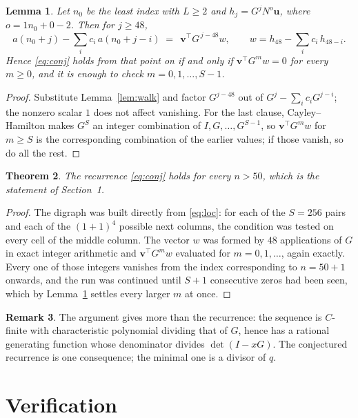 \documentclass[11pt,a4paper]{article}
\theoremstyle{plain}
\newtheorem{theorem}{Theorem}
\newtheorem{lemma}[theorem]{Lemma}
\theoremstyle{definition}
\newtheorem{remark}[theorem]{Remark}
\begin{document}
\begin{lemma}\label{lem:crit}
Let $n_0$ be the least index with $L\ge2$ and $h_j=G^{j}N^{o}\mathbf{u}$, where
$o=1n_0+0-2$. Then for $j\ge48$,
\[
a(n_0+j)-\sum_i c_i\,a(n_0+j-i)\;=\;\,\mathbf{v}^{\!\top}G^{\,j-48}w,
\qquad w=h_{48}-\sum_i c_i\,h_{48-i} .
\]
Hence \eqref{eq:conj} holds from that point on if and only if
$\mathbf{v}^{\!\top}G^{m}w=0$ for every $m\ge0$, and it is enough to check
$m=0,1,\dots,S-1$.
\end{lemma}

\begin{proof}
Substitute Lemma~\ref{lem:walk} and factor $G^{j-48}$ out of
$G^{j}-\sum_ic_iG^{j-i}$; the nonzero scalar $1$ does not affect
vanishing. For the last clause, Cayley--Hamilton makes $G^{S}$ an integer combination of
$I,G,\dots,G^{S-1}$, so $\mathbf{v}^{\!\top}G^{m}w$ for $m\ge S$ is the corresponding
combination of the earlier values; if those vanish, so do all the rest.
\end{proof}

\begin{theorem}
The recurrence \eqref{eq:conj} holds for every $n>50$, which is the statement of
Section~1.
\end{theorem}

\begin{proof}
The digraph was built directly from \eqref{eq:loc}: for each of the $S=256$ pairs and each
of the $(1+1)^{4}$ possible next columns, the condition was tested on every cell of
the middle column. The vector $w$ was formed by $48$ applications of $G$ in exact integer
arithmetic and $\mathbf{v}^{\!\top}G^{m}w$ evaluated for $m=0,1,\dots$, again exactly.
Every one of those integers vanishes from the index corresponding to $n=50+1$ onwards,
and the run was continued until $S+1$ consecutive zeros had been seen, which by
Lemma~\ref{lem:crit} settles every larger $m$ at once.
\end{proof}

\begin{remark}
The argument gives more than the recurrence: the sequence is $C$-finite with characteristic
polynomial dividing that of $G$, hence has a rational generating function whose denominator
divides $\det(I-xG)$. The conjectured recurrence is one consequence; the minimal one is a
divisor of $q$.
\end{remark}

\section{Verification}
\end{document}

